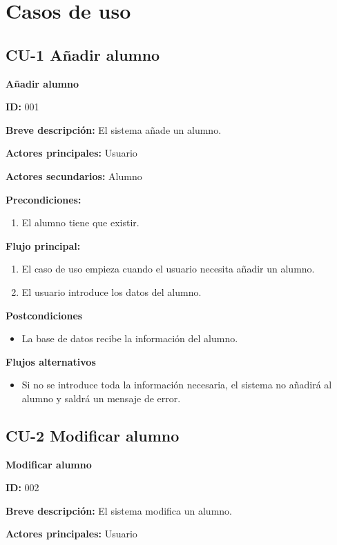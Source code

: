 \section{Casos de uso}
\subsection{CU-1 Añadir alumno}
\textbf{Añadir alumno}

\textbf{ID:} 001

\textbf{Breve descripción:} El sistema añade un alumno.

\textbf{Actores principales:} Usuario

\textbf{Actores secundarios:} Alumno

\textbf{Precondiciones:}

\begin{enumerate}
	\item El alumno tiene que existir.
\end{enumerate}

\textbf{Flujo principal:}

\begin{enumerate}
	\item El caso de uso empieza cuando el usuario necesita añadir un alumno.
	\item El usuario introduce los datos del alumno.
\end{enumerate}

\textbf{Postcondiciones}

\begin{itemize}
	\item La base de datos recibe la información del alumno.
\end{itemize}

\textbf{Flujos alternativos}

\begin{itemize}
	\item Si no se introduce toda la información necesaria, el sistema no añadirá al alumno y saldrá un mensaje de error.
\end{itemize}

\subsection{CU-2 Modificar alumno}
\textbf{Modificar alumno}

\textbf{ID:} 002

\textbf{Breve descripción:} El sistema modifica un alumno.

\textbf{Actores principales:} Usuario

